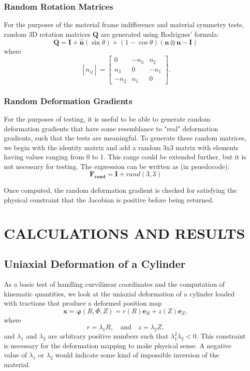 \documentclass[]{spie}  %
\begin{document}
\subsubsection{Random Rotation Matrices}
For the purposes of the material frame indifference and material symmetry tests, random 3D rotation matrices $\bm{Q}$ are generated using Rodrigues' formula:
\begin{equation}
\label{eq: random rotation}
	\bm{Q} = \bm{I} + \bm{\hat{n}}(\sin\theta)  + (1 - \cos\theta)(\bm{n} \otimes \bm{n} - \bm{I})
\end{equation}
where
\begin{equation}
	\left[\hat{n}_{ij}\right] = 
	\begin{bmatrix}
		0		&	-n_3	&	n_2 \\
		n_3		&	0		&	-n_1 \\
		-n_2	& 	n_1		& 0
	\end{bmatrix} .
\end{equation}

\subsubsection{Random Deformation Gradients}
For the purposes of testing, it is useful to be able to generate random deformation gradients that have some resemblance to "real" deformation gradients, such that the tests are meaningful. To generate these random matrices, we begin with the identity matrix and add a random 3x3 matrix with elements having values ranging from 0 to 1. This range could be extended further, but it is not necessary for testing. The expression can be written as (in psuedocode):
\begin{equation}
\label{eq: random deformation gradient}
	\bm{F_{rand}} = \bm{I} + rand(3,3)
\end{equation}

Once computed, the random deformation gradient is checked for satisfying the physical constraint that the Jacobian is positive before being returned. 

	
\section{CALCULATIONS AND RESULTS} 

\subsection{Uniaxial Deformation of a Cylinder}
As a basic test of handling curvilinear coordinates and the computation of kinematic quantities, we look at the uniaxial deformation of a cylinder loaded with tractions that produce a deformed position map
\[
\bm{x} = \bm{\varphi}(R,\Phi,Z) = r(R) \bm{e}_R + z(Z) \bm{e}_Z ,
\]
where 
\[
r = \lambda_1 R, \quad \text{and} \quad z = \lambda_2 Z,
\]
and $\lambda_1$ and $\lambda_2$ are arbitrary positive numbers such that $\lambda_1^2\lambda_2<0$. This constraint is necessary for the deformation mapping to make physical sense. A negative value of $\lambda_1$ or $\lambda_2$ would indicate some kind of impossible inversion of the material. 
\end{document}
